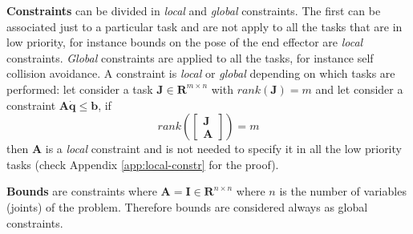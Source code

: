 \textbf{Constraints} can be divided in \emph{local} and \emph{global} constraints. The first can be associated just to a particular task and are not apply to all the tasks that are in low priority, for instance bounds on the pose of the end effector are \emph{local} constraints. \emph{Global} constraints are applied to all the tasks, for instance self collision avoidance. A constraint is \emph{local} or \emph{global} depending on which tasks are performed: let consider a task $\mathbf{J} \in \mathbf{R}^{m\times n}$ with $rank(\mathbf{J}) = m$ and let consider a constraint $\mathbf{A}\mathbf{\dot{q}} \leq \mathbf{b}$, if 
\begin{equation}
rank\left ( \begin{bmatrix}
\mathbf{J}\\ 
\mathbf{A}
\end{bmatrix} \right ) = m
\end{equation}
then $\mathbf{A}$ is a \emph{local} constraint and is not needed to specify it in all the low priority tasks (check Appendix \ref{app:local-constr} for the proof).

\textbf{Bounds} are constraints where $\mathbf{A} = \mathbf{I} \in \mathbf{R}^{n\times n}$ where $n$ is the number of variables (joints) of the problem. Therefore bounds are considered always as global constraints.

